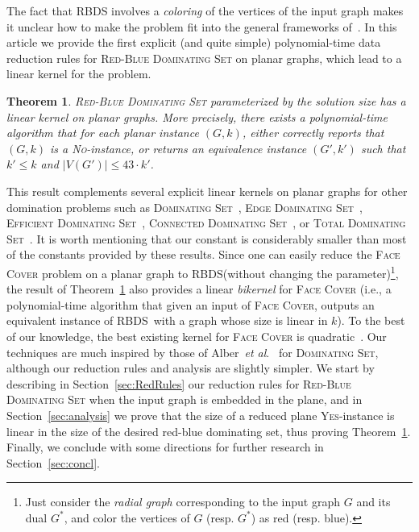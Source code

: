 \documentclass[a4paper,11pt]{article}
\newcommand{\RBDS}{\textsc{RBDS}\xspace}
\newcommand{\YES}{\textsc{Yes}}
\newtheorem{theorem}{Theorem}\newtheorem{lemma}[theorem]{Lemma}
\begin{document}
The fact that \RBDS involves a {\sl coloring} of the vertices of the input graph makes it unclear how to make the problem fit into the general frameworks of~\cite{GuNi07,BFL+09,FLST10,KLP+12}. In this article we provide the first explicit (and quite simple) polynomial-time data reduction rules for \textsc{Red-Blue Dominating Set} on planar graphs, which lead to a linear kernel for the problem.

\begin{theorem}
\label{th:main}
\textsc{Red-Blue Dominating Set} parameterized by the solution size has a linear kernel on planar graphs. More precisely, there exists a polynomial-time algorithm that for each planar instance $(G,k)$, either correctly reports that $(G,k)$ is a \textsc{No}-instance, or returns an equivalence instance $(G',k')$ such that $k'\leq k$ and $|V(G')| \leq 43 \cdot k'$.
\end{theorem}



This result complements several explicit linear kernels on planar graphs for other domination problems such as \textsc{Dominating Set}~\cite{AFN04}, \textsc{Edge Dominating Set}~\cite{WYGC13,GuNi07}, \textsc{Efficient Dominating Set}~\cite{GuNi07}, \textsc{Connected Dominating Set}~\cite{LMS11,GuIm10}, or \textsc{Total Dominating Set}~\cite{GaSa12}. It is worth mentioning that our constant is considerably smaller than most of the constants provided by these results. Since one can easily reduce the \textsc{Face Cover} problem on a planar graph to \RBDS (without changing the parameter)\footnote{Just consider the \emph{radial graph} corresponding to the input graph $G$ and its dual $G^*$, and color the vertices of $G$ (resp. $G^*$) as red (resp. blue). }, the result of Theorem~\ref{th:main} also provides a linear \emph{bikernel} for \textsc{Face Cover} (i.e., a polynomial-time algorithm that given an input
of \textsc{Face Cover}, outputs an equivalent instance of \RBDS\ with a graph whose size is linear in $k$). To the best of our knowledge, the best existing kernel for \textsc{Face Cover} is quadratic~\cite{KLL02}. Our techniques are much inspired by those of Alber~\emph{et al}.~\cite{AFN04} for \textsc{Dominating Set}, although our reduction rules and analysis are slightly simpler. We start by describing in Section~\ref{sec:RedRules} our reduction rules for \textsc{Red-Blue Dominating Set} when the input graph is embedded in the plane, and in Section~\ref{sec:analysis} we prove that the size of a reduced plane \YES-instance is linear in the size of the desired red-blue dominating set, thus proving Theorem~\ref{th:main}. Finally, we conclude with some directions for further research in Section~\ref{sec:concl}.
\end{document}

